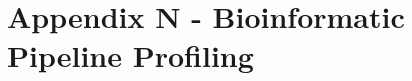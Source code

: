 \documentclass{standalone}
\begin{document}
\chapter*{Appendix N - Bioinformatic Pipeline Profiling}







\end{document}
